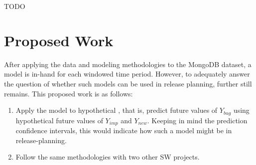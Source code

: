 \documentclass[a4paper]{scrartcl}
\begin{document}
TODO 
%
%

\section*{Proposed Work}
\label{sec:proposed_work}

After applying the data and modeling methodologies to the MongoDB dataset, a model is in-hand for each windowed time period. However, to adequately answer the question of whether such models can be used in release planning, further still remains. This proposed work is as follows:

\begin{enumerate}
\item
Apply the model to hypothetical , that is, predict future values of $Y_{bug}$ using hypothetical future values of $Y_{imp}$ and $Y_{new}$. Keeping in mind the prediction confidence intervals, this would indicate how such a model might be in release-planning.

\item
Follow the same methodologies with two other SW projects.
\end{enumerate}
\end{document}
